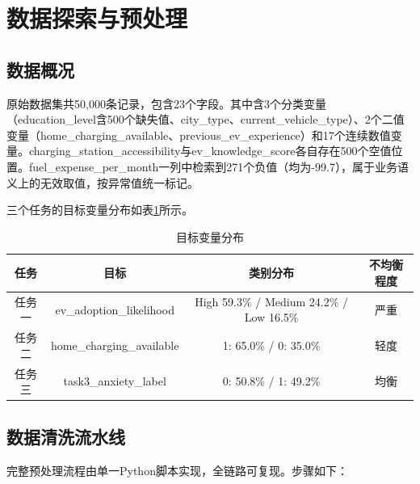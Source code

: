 \section{数据探索与预处理}

\subsection{数据概况}

原始数据集共50,000条记录，包含23个字段。其中含3个分类变量（education\_level含500个缺失值、city\_type、current\_vehicle\_type）、2个二值变量（home\_charging\_available、previous\_ev\_experience）和17个连续数值变量。charging\_station\_accessibility与ev\_knowledge\_score各自存在500个空值位置。fuel\_expense\_per\_month一列中检索到271个负值（均为-99.7），属于业务语义上的无效取值，按异常值统一标记。

三个任务的目标变量分布如表\ref{tab:target_dist}所示。

\begin{table}[H]
\centering
\caption{目标变量分布}
\label{tab:target_dist}
\begin{tabular}{cccc}
\toprule
\textbf{任务} & \textbf{目标} & \textbf{类别分布} & \textbf{不均衡程度} \\
\midrule
任务一 & ev\_adoption\_likelihood & High 59.3\% / Medium 24.2\% / Low 16.5\% & 严重 \\
任务二 & home\_charging\_available & 1: 65.0\% / 0: 35.0\% & 轻度 \\
任务三 & task3\_anxiety\_label & 0: 50.8\% / 1: 49.2\% & 均衡 \\
\bottomrule
\end{tabular}
\end{table}

\subsection{数据清洗流水线}

完整预处理流程由单一Python脚本实现，全链路可复现。步骤如下：

